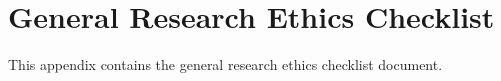 %
%
%                 

\chapter{General Research Ethics Checklist}
\label{sec:appendixf}

This appendix contains the general research ethics checklist document. 



